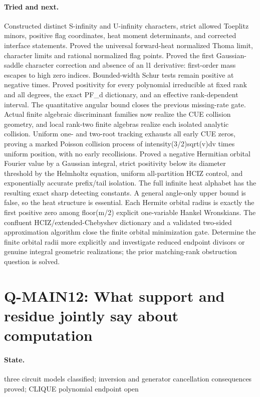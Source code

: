 \paragraph{Tried and next.} Constructed distinct S-infinity and U-infinity characters, strict allowed Toeplitz minors, positive flag coordinates, heat moment determinants, and corrected interface statements. Proved the universal forward-heat normalized Thoma limit, character limits and rational normalized flag points. Proved the first Gaussian-saddle character correction and absence of an l1 derivative: first-order mass escapes to high zero indices. Bounded-width Schur tests remain positive at negative times. Proved positivity for every polynomial irreducible at fixed rank and all degrees, the exact PF\_d dictionary, and an effective rank-dependent interval. The quantitative angular bound closes the previous missing-rate gate. Actual finite algebraic discriminant families now realize the CUE collision geometry, and local rank-two finite algebras realize each isolated analytic collision. Uniform one- and two-root tracking exhausts all early CUE zeros, proving a marked Poisson collision process of intensity(3/2)sqrt(v)dv times uniform position, with no early recollisions. Proved a negative Hermitian orbital Fourier value by a Gaussian integral, strict positivity below its diameter threshold by the Helmholtz equation, uniform all-partition HCIZ control, and exponentially accurate prefix/tail isolation. The full infinite heat alphabet has the resulting exact sharp detecting constants. A general angle-only upper bound is false, so the heat structure is essential. Each Hermite orbital radius is exactly the first positive zero among floor(m/2) explicit one-variable Hankel Wronskians. The confluent HCIZ/extended-Chebyshev dictionary and a validated two-sided approximation algorithm close the finite orbital minimization gate. Determine the finite orbital radii more explicitly and investigate reduced endpoint divisors or genuine integral geometric realizations; the prior matching-rank obstruction question is solved.

\section{Q-MAIN12: What support and residue jointly say about computation}
\paragraph{State.} three circuit models classified; inversion and generator cancellation consequences proved; CLIQUE polynomial endpoint open
